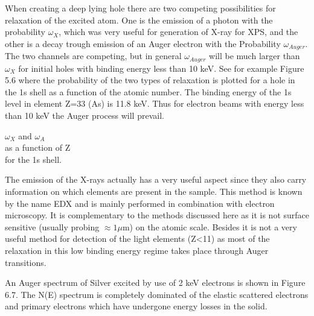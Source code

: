           When creating a deep lying  hole  there  are  two  competing
          possibilities for relaxation of the excited atom.  One  is
          the emission of a photon with the  probability  $\omega_{X}$,
          which was very useful for generation of X-ray  for  XPS,  and
          the other is a decay trough emission of  an  Auger  electron
          with the Probability $\omega_{Auger}$. The two channels  are
          competing, but in  general  $\omega_{Auger}$  will  be  much
          larger than $\omega_{X}$  for  initial  holes  with  binding
          energy less than 10 keV. See for example  Figure  5.6  where
          the probability of the two types of  relaxation  is  plotted
          for a hole in the 1s shell  as  a  function  of  the  atomic
          number. The binding energy of the 1s level in  element  Z=33
          (As) is 11.8 keV. Thus for electron beams with  energy  less
          than 10 keV the Auger process will prevail.\\

          \vspace{1cm}

           $\omega_{X}$ and  $\omega_{A}$\\  as  a
          function of Z\\ for the 1s shell.\\

          \vspace{4cm}

          The emission of the  X-rays  actually  has  a  very  useful
          aspect since they also carry information on  which  elements
          are present in the sample. This method  is  known  by  the
          name  EDX  and  is  mainly  performed  in  combination  with
          electron microscopy. It is  complementary  to  the  methods
          discussed here as  it  is  not  surface  sensitive  (usually
          probing $\approx 1 \mu$m) on the atomic scale. Besides it is
          not a very useful method for detection of the light elements
          (Z<11) as most of the relaxation in this low binding  energy
          regime takes place through Auger transitions.


          An Auger  spectrum  of  Silver  excited  by  use  of  2  keV
          electrons is shown in  Figure  6.7.  The  N(E)  spectrum  is
          completely dominated of the elastic  scattered  electrons
          and primary electrons which have undergone energy  losses  in
          the solid.\\

